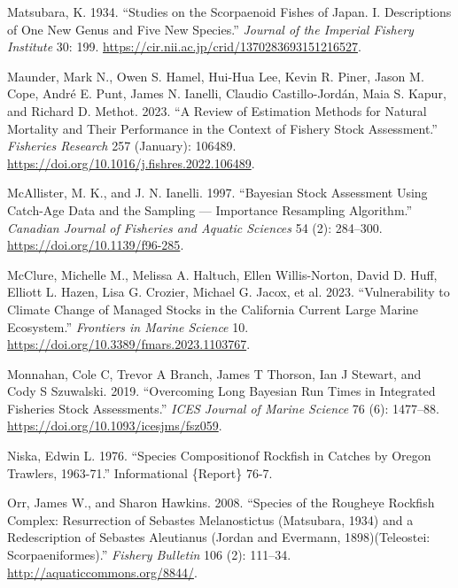 \documentclass[
]{scrartcl}
\newlength{\cslhangindent}
\newenvironment{CSLReferences}[2] %
 {\begin{list}{}{%
  \setlength{\itemindent}{0pt}
  \setlength{\leftmargin}{0pt}
  \setlength{\parsep}{0pt}
  \ifodd #1
   \setlength{\leftmargin}{\cslhangindent}
   \setlength{\itemindent}{-1\cslhangindent}
  \fi
  \setlength{\itemsep}{#2\baselineskip}}}
 {\end{list}}
\begin{document}
\begin{CSLReferences}{1}{0}
Matsubara, K. 1934. {``Studies on the Scorpaenoid Fishes of Japan. I.
Descriptions of One New Genus and Five New Species.''} \emph{Journal of
the Imperial Fishery Institute} 30: 199.
\url{https://cir.nii.ac.jp/crid/1370283693151216527}.

Maunder, Mark N., Owen S. Hamel, Hui-Hua Lee, Kevin R. Piner, Jason M.
Cope, André E. Punt, James N. Ianelli, Claudio Castillo-Jordán, Maia S.
Kapur, and Richard D. Methot. 2023. {``A Review of Estimation Methods
for Natural Mortality and Their Performance in the Context of Fishery
Stock Assessment.''} \emph{Fisheries Research} 257 (January): 106489.
\url{https://doi.org/10.1016/j.fishres.2022.106489}.

McAllister, M. K., and J. N. Ianelli. 1997. {``Bayesian Stock Assessment
Using Catch-Age Data and the Sampling --- Importance Resampling
Algorithm.''} \emph{Canadian Journal of Fisheries and Aquatic Sciences}
54 (2): 284--300. \url{https://doi.org/10.1139/f96-285}.

McClure, Michelle M., Melissa A. Haltuch, Ellen Willis-Norton, David D.
Huff, Elliott L. Hazen, Lisa G. Crozier, Michael G. Jacox, et al. 2023.
{``Vulnerability to Climate Change of Managed Stocks in the {California
Current} Large Marine Ecosystem.''} \emph{Frontiers in Marine Science}
10. \url{https://doi.org/10.3389/fmars.2023.1103767}.

Monnahan, Cole C, Trevor A Branch, James T Thorson, Ian J Stewart, and
Cody S Szuwalski. 2019. {``Overcoming Long Bayesian Run Times in
Integrated Fisheries Stock Assessments.''} \emph{{ICES} Journal of
Marine Science} 76 (6): 1477--88.
\url{https://doi.org/10.1093/icesjms/fsz059}.

Niska, Edwin L. 1976. {``Species {Compositionof} Rockfish in Catches by
{Oregon} {Trawlers}, 1963-71.''} Informational \{Report\} 76-7.

Orr, James W., and Sharon Hawkins. 2008. {``Species of the Rougheye
Rockfish Complex: Resurrection of {Sebastes} Melanostictus ({Matsubara},
1934) and a Redescription of {Sebastes} Aleutianus ({Jordan} and
{Evermann}, 1898)({Teleostei}: {Scorpaeniformes}).''} \emph{Fishery
Bulletin} 106 (2): 111--34. \url{http://aquaticcommons.org/8844/}.


\end{CSLReferences}
\end{document}
